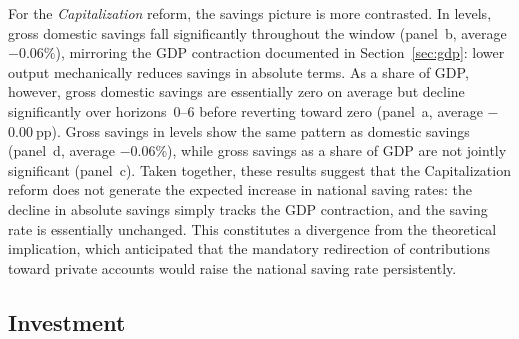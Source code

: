 \documentclass[11pt,english,a4paper, twoside, authoryear]{article}
\begin{document}
For the \textit{Capitalization} reform, the savings picture is more contrasted. In levels, gross domestic savings fall significantly throughout the window (panel~b, average $-$0.06\%), mirroring the GDP contraction documented in Section~\ref{sec:gdp}: lower output mechanically reduces savings in absolute terms. As a share of GDP, however, gross domestic savings are essentially zero on average but decline significantly over horizons~0--6 before reverting toward zero (panel~a, average $-$0.00$~$pp). Gross savings in levels show the same pattern as domestic savings (panel~d, average $-$0.06\%), while gross savings as a share of GDP are not jointly significant (panel~c). Taken together, these results suggest that the Capitalization reform does not generate the expected increase in national saving rates: the decline in absolute savings simply tracks the GDP contraction, and the saving rate is essentially unchanged. This constitutes a divergence from the theoretical implication, which anticipated that the mandatory redirection of contributions toward private accounts would raise the national saving rate persistently.



\FloatBarrier
\subsection{Investment}
\label{sec:invest}
\label{sec:invest}
\end{document}

